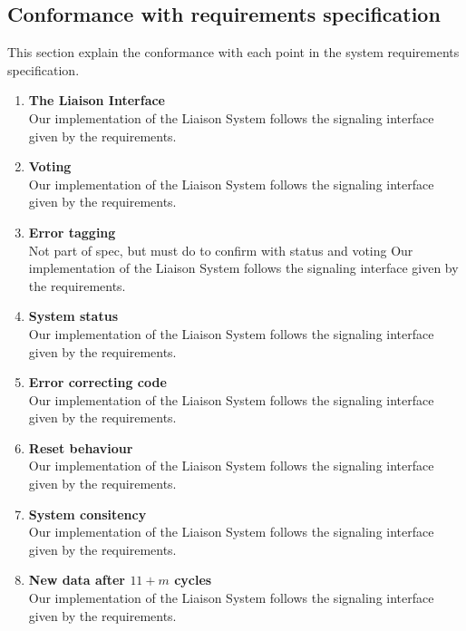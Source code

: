 \subsection{Conformance with requirements specification}
This section explain the conformance with each point in the system requirements specification.
\begin{enumerate}
\item{\textbf{The Liaison Interface}} \hfill\\
    Our implementation of the Liaison System follows the signaling interface given by the requirements.

\item{\textbf{Voting}} \hfill\\
    Our implementation of the Liaison System follows the signaling interface given by the requirements.

\item{\textbf{Error tagging}} \hfill\\
    Not part of spec, but must do to confirm with status and voting
    Our implementation of the Liaison System follows the signaling interface given by the requirements.

\item{\textbf{System status}} \hfill\\
    Our implementation of the Liaison System follows the signaling interface given by the requirements.

\item{\textbf{Error correcting code}} \hfill\\
    Our implementation of the Liaison System follows the signaling interface given by the requirements.

\item{\textbf{Reset behaviour}} \hfill\\
    Our implementation of the Liaison System follows the signaling interface given by the requirements.


\item{\textbf{System consitency}} \hfill\\
    Our implementation of the Liaison System follows the signaling interface given by the requirements.

\item{\textbf{New data after $11+m$ cycles}} \hfill\\
    Our implementation of the Liaison System follows the signaling interface given by the requirements.

\end{enumerate}
